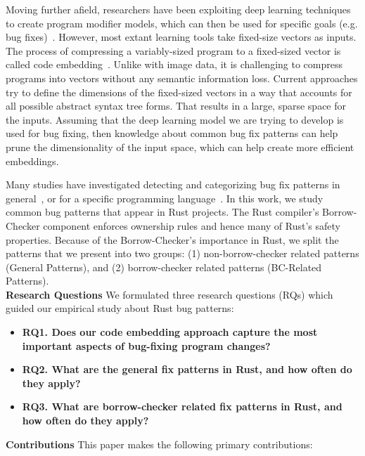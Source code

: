 Moving further afield, researchers have been exploiting deep learning techniques to create program modifier models, which can then be used for specific goals (e.g. bug fixes)~\citep{alon2019code2vec,alon2018general,raychev2016learning,bielik2016phog}. However, most extant learning tools take fixed-size vectors as inputs. The process of compressing a variably-sized program to a fixed-sized vector is called code embedding~\citep{chen2019literature}. Unlike with image data, it is challenging to compress programs into vectors without any semantic information loss. Current approaches try to define the dimensions of the fixed-sized vectors in a way that accounts for all possible abstract syntax tree forms. That results in a large, sparse space for the inputs. Assuming that the deep learning model we are trying to develop is used for bug fixing, then knowledge about common bug fix patterns can help prune the dimensionality of the input space, which can help create more efficient embeddings.

Many studies have investigated detecting and categorizing bug fix patterns in general~\citep{islam2021changes,madeiral2018towards,pan2009toward}, or for a specific programming language~\citep{yang2022mining,hanam2016discovering,campos2019discovering}. In this work, we study common bug patterns that appear in Rust projects. The Rust compiler's Borrow-Checker component enforces ownership rules and hence many of Rust's safety properties. Because of the Borrow-Checker's importance in Rust, we split the patterns that we present into two groups: (1) non-borrow-checker related patterns (General Patterns), and (2) borrow-checker related patterns (BC-Related Patterns). \\

\noindent \textbf{Research Questions} We formulated three research questions (RQs) which guided our empirical study about Rust bug patterns:

\begin{itemize}
    \item \textbf{RQ1. Does our code embedding approach capture the most important aspects of bug-fixing program changes?} 
    \item \textbf{RQ2. What are the general fix patterns in Rust, and how often do they apply?} 
    \item \textbf{RQ3. What are borrow-checker related fix patterns in Rust, and how often do they apply?}
\end{itemize}

\noindent \textbf{Contributions} This paper makes the following primary contributions:

